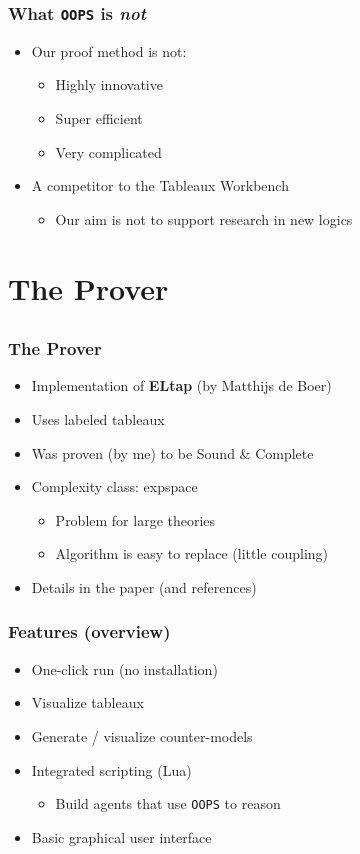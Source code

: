 \documentclass{beamer}
\begin{document}
\begin{frame}
\frametitle{What {\tt OOPS} is {\em not}}
\begin{itemize}
\item Our proof method is not:
	\begin{itemize}
	\item Highly innovative
	\item Super efficient
	\item Very complicated
	\end{itemize}
\item A competitor to the Tableaux Workbench
	\begin{itemize}
	\item Our aim is not to support research in new logics
	\end{itemize}
\end{itemize}
\end{frame}

\section{The Prover}
\subsection{}

\begin{frame}
\frametitle{The Prover}
\begin{itemize}
\item Implementation of {\bf ELtap} (by Matthijs de Boer)
\item Uses labeled tableaux
\item Was proven (by me) to be Sound \& Complete
\item Complexity class: {\sc expspace}
	\begin{itemize}
	\item Problem for large theories
	\item Algorithm is easy to replace (little coupling)
	\end{itemize}
\item Details in the paper (and references)
\end{itemize}
\end{frame}

\begin{frame}
\frametitle{Features (overview)}
\begin{itemize}
\item One-click run (no installation)
\item Visualize tableaux
\item Generate / visualize counter-models
\item Integrated scripting (Lua)
	\begin{itemize}
	\item Build agents that use {\tt OOPS} to reason
	\end{itemize}
\item Basic graphical user interface
\end{itemize}
\end{frame}
\end{document}
